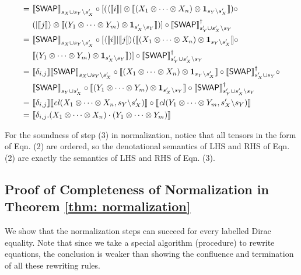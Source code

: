 \begin{itemize}
\begin{align*}
    =\ & {\llbracket {\mathsf{SWAP}} \rrbracket}_{s_X\cup s_Y\backslash s_X'}\circ[(\langle{\llbracket i \rrbracket}| \otimes {\llbracket (X_1\otimes\cdots\otimes X_n) \otimes \mathbf{1}_{s_Y\backslash s_X'} \rrbracket})\circ \\
    &(|{\llbracket j \rrbracket}\rangle \otimes {\llbracket (Y_1\otimes\cdots\otimes Y_m) \otimes \mathbf{1}_{s_X'\backslash s_Y} \rrbracket})]\circ {\llbracket {\mathsf{SWAP}}\rrbracket}_{s_Y'\cup s_X'\backslash s_Y}^\dagger\\
    =\ & {\llbracket {\mathsf{SWAP}} \rrbracket}_{s_X\cup s_Y\backslash s_X'}\circ[\langle{\llbracket i \rrbracket}|{\llbracket j \rrbracket}\rangle ({\llbracket (X_1\otimes\cdots\otimes X_n) \otimes \mathbf{1}_{s_Y\backslash s_X'} \rrbracket}\circ \\
    &{\llbracket (Y_1\otimes\cdots\otimes Y_m) \otimes \mathbf{1}_{s_X'\backslash s_Y} \rrbracket})]\circ {\llbracket {\mathsf{SWAP}}\rrbracket}_{s_Y'\cup s_X'\backslash s_Y}^\dagger\\
    =\ & {\llbracket \delta_{i,j} \rrbracket} {\llbracket {\mathsf{SWAP}} \rrbracket}_{s_X\cup s_Y\backslash s_X'}\circ{\llbracket (X_1\otimes\cdots\otimes X_n) \otimes \mathbf{1}_{s_Y\backslash s_X'} \rrbracket}\circ {\llbracket {\mathsf{SWAP}}\rrbracket}_{s_X'\cup s_Y}^\dagger \circ \\
    &{\llbracket {\mathsf{SWAP}} \rrbracket}_{s_Y\cup s_X'} \circ {\llbracket (Y_1\otimes\cdots\otimes Y_m) \otimes \mathbf{1}_{s_X'\backslash s_Y} \rrbracket}\circ {\llbracket {\mathsf{SWAP}}\rrbracket}_{s_Y'\cup s_X'\backslash s_Y}^\dagger\\
    =\ & {\llbracket \delta_{i,j} \rrbracket} {\llbracket {\mathit{cl}}(X_1\otimes\cdots\otimes X_n, s_Y\backslash s_X') \rrbracket}\circ 
    {\llbracket {\mathit{cl}}(Y_1\otimes\cdots\otimes Y_m, s_X'\backslash s_Y) \rrbracket} \\
    =\ & {\llbracket \delta_{i,j}. (X_1\otimes\cdots\otimes X_n)\cdot (Y_1\otimes\cdots\otimes Y_m) \rrbracket}
  \end{align*}
\end{itemize}

For the soundness of step (3) in normalization, notice that all tensors in the form of Eqn. (2) are ordered, so the denotational semantics of LHS and RHS of Eqn. (2) are exactly the semantics of LHS and RHS of Eqn. (3).

\subsection{Proof of Completeness of Normalization in Theorem \ref{thm: normalization}}
We show that the normalization steps can succeed for every labelled Dirac equality.
Note that since we take a special algorithm (procedure) to rewrite equations, the conclusion is weaker than showing the confluence and termination of all these rewriting rules.

